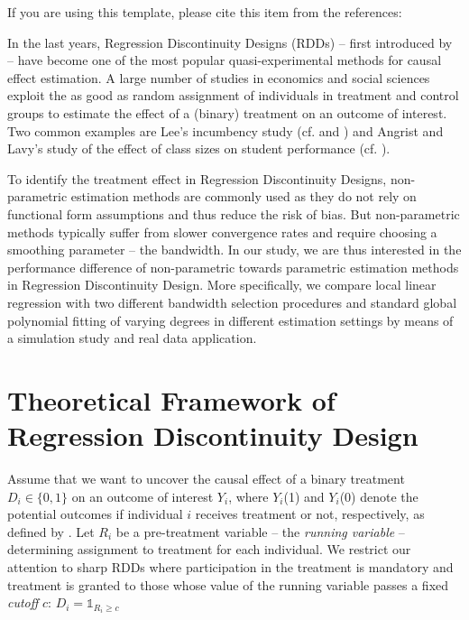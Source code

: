 \documentclass[11pt, a4paper, leqno]{article}
\numberwithin{equation}{section}
\numberwithin{figure}{section}
\numberwithin{table}{section}
\numberwithin{algorithm}{section}
\begin{document}
If you are using this template, please cite this item from the references: \citet{GaudeckerEconProjectTemplates}

In the last years, Regression Discontinuity Designs (RDDs) -- first introduced by \cite{thistlethwaite_campbell} -- have become one of the most popular quasi-experimental methods for causal effect estimation. A large number of studies in economics and social sciences exploit the as good as random assignment of individuals in treatment and control groups to estimate the effect of a (binary) treatment on an outcome of interest. Two common examples are Lee's incumbency study (cf. \cite{lee_2001} and \cite{lee_2007})
and Angrist and Lavy's study of the effect of class sizes on student performance (cf. \cite{angrist_lavy}).

To identify the treatment effect in Regression Discontinuity Designs, non-parametric estimation methods are commonly used as they do not rely on functional form assumptions and thus reduce the risk of bias. But non-parametric methods typically suffer from slower convergence rates and require choosing a smoothing parameter -- the bandwidth. In our study, we are thus interested in the performance difference of non-parametric towards parametric estimation methods in Regression Discontinuity Design. More specifically, we compare local linear regression with two different bandwidth selection procedures and standard global polynomial fitting of varying degrees in different estimation settings by means of a simulation study and real data application.


\section{Theoretical Framework of Regression Discontinuity Design} %
\label{sec:framework}

Assume that we want to uncover the causal effect of a binary treatment $ D_{i} \in \lbrace 0,1 \rbrace $ on an outcome of interest $Y_{i}$, where $Y_{i}$(1) and $Y_{i}$(0) denote the potential outcomes if individual $i$ receives treatment or not, respectively, as defined by \cite{rubin}. Let $R_{i}$ be a pre-treatment variable -- the \textit{running variable} -- determining assignment to treatment for each individual. We restrict our attention to sharp RDDs where participation in the treatment is mandatory and treatment is granted to those whose value of the running variable passes a fixed \textit{cutoff} $c$: $D_{i} = \mathds{1}_{R_{i} \geq c}$
\end{document}
